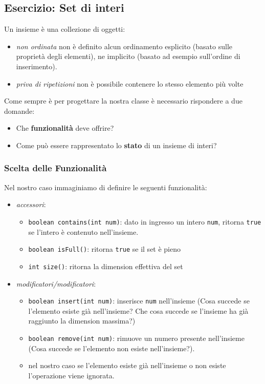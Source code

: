 \documentclass{article}
\begin{document}





\subsection{Esercizio: Set di interi}
Un insieme \`e una collezione di oggetti:
\begin{itemize}
	\item \emph{non ordinata} non è definito alcun ordinamento esplicito (basato sulle proprietà degli elementi),
	ne implicito (basato ad esempio sull'ordine di inserimento).
	\item \emph{priva di ripetizioni} non è possibile contenere lo stesso elemento più volte
\end{itemize}

Come sempre \`e per progettare la nostra classe \`e necessario rispondere a due domande:
\begin{itemize}
		\item Che \textbf{funzionalità} deve offrire?
	\item Come può essere rappresentato lo \textbf{stato} di un insieme di interi?
\end{itemize}

\subsubsection{Scelta delle Funzionalit\`a}

Nel nostro caso immaginiamo di definire le seguenti funzionalit\`a:
\begin{itemize}
\item \emph{accessori}:
\begin{itemize}
\item \texttt{boolean contains(int num)}: dato in ingresso un intero \texttt{num}, ritorna \texttt{true} se l'intero è contenuto nell'insieme.
\item \texttt{boolean isFull()}: ritorna \texttt{true} se il set \`e pieno
\item \texttt{int size()}: ritorna la dimension effettiva del set
\end{itemize}
\item \emph{modificatori/modificatori}:
\begin{itemize}
\item  \texttt{boolean insert(int num)}: inserisce \texttt{num} nell'insieme (Cosa succede se l'elemento esiste gi\`a nell'insieme?
Che cosa succede se l'insieme ha gi\`a raggiunto la dimension massima?)
\item \texttt{boolean remove(int num)}: rimuove un numero presente nell'insieme (Cosa succede se l'elemento non esiste  nell'insieme?).
\item nel nostro caso se l'elemento esiste gi\`a nell'insieme o non esiste l'operazione viene  ignorata.
\end{itemize}
\end{itemize}
\end{document}
